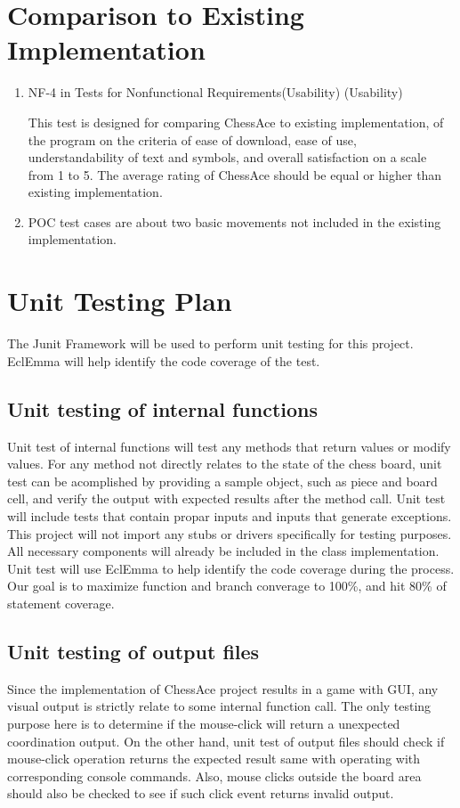 \documentclass[12pt, titlepage]{article}
\begin{document}
\section{Comparison to Existing Implementation}
	
\begin{enumerate}
\item {NF-4 in Tests for Nonfunctional Requirements(Usability)} (Usability)

This test is designed for comparing ChessAce to existing implementation, of the program on the criteria of ease of download, ease of use, understandability of text and symbols, and overall satisfaction on a scale from 1 to 5. The average rating of ChessAce should be equal or higher than existing implementation. 

\item POC test cases are about two basic movements not included in the existing implementation.
\end{enumerate}		
\newpage
\section{Unit Testing Plan}

The Junit Framework will be used to perform unit testing for this project. EclEmma will help identify the code coverage of the test.		

\subsection{Unit testing of internal functions}
Unit test of internal functions will test any methods that return values or modify values. For any method not directly relates to the state of the chess board, unit test can be acomplished by providing a sample object, such as piece and board cell, and verify the output with expected results after the method call. Unit test will include tests that contain propar inputs and inputs that generate exceptions. This project will not import any stubs or drivers specifically for testing purposes. All necessary components will already be included in the class implementation. Unit test will use EclEmma to help identify the code coverage during the process. Our goal is to maximize function and branch converage to 100\%, and hit 80\% of statement coverage.
\subsection{Unit testing of output files}		
Since the implementation of ChessAce project results in a game with GUI, any visual output is strictly relate to some internal function call. The only testing purpose here is to determine if the mouse-click will return a unexpected coordination output. On the other hand, unit test of output files should check if mouse-click operation returns the expected result same with operating with corresponding console commands. Also, mouse clicks outside the board area should also be checked to see if such click event returns invalid output.
\end{document}

